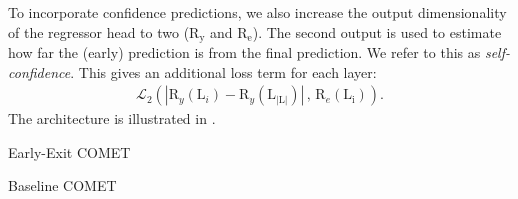 To incorporate confidence predictions, we also increase the output dimensionality of the regressor head to two ($\mathrm{R}_{\mathrm{y}}$ and $\mathrm{R}_{\mathrm{e}}$).
The second output is used to estimate how far the (early) prediction is from the final prediction.
We refer to this as \textit{self-confidence}.
This gives an additional loss term for each layer:
\begin{align}
\mathcal{L}_2 \left(|\mathrm{R}_{y}(\mathrm{L}_i)-\mathrm{R}_{y}(\mathrm{L_\mathrm{|L|}})|\, , \,\mathrm{R}_{e}(\mathrm{L_i})\right).
\end{align}
The architecture is illustrated in .




\begin{table}[t]
\small
\setlength{\tabcolsep}{3pt}
\centering


\vspace{-2mm}
Early-Exit COMET

\vspace{-1mm}


\vspace{-2mm}
Baseline COMET

\caption{Pearson correlations between intermediate layer outputs (green) and between intermediate layer outputs and humans (purple) for supervised Early-Exit as described in  (left) and unsupervised Early-Exit based on standard COMET (right). See Appendix  for detailed version.}
\label{10-eval_oxygen_hydrogen}

\vspace{-3mm}
\end{table}

